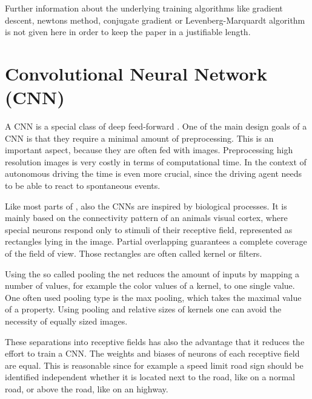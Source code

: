 Further information about the underlying training algorithms like gradient descent, newtons method, conjugate gradient or Levenberg-Marquardt algorithm is not given here in order to keep the paper in a justifiable length.  


\section{Convolutional Neural Network (CNN)}\label{sec:CNN}

A CNN is a special class of deep feed-forward \nns. One of the main design goals of a CNN is that they require a minimal amount of preprocessing. This is an important aspect, because they are often fed with images. Preprocessing high resolution images is very costly in terms of computational time. In the context of autonomous driving the time is even more crucial, since the driving agent needs to be able to react to spontaneous events.

Like most parts of \nns, also the CNNs are inspired by biological processes. It is mainly based on the connectivity pattern of an animals visual cortex, where special neurons respond only to stimuli of their receptive field, represented as rectangles lying in the image. Partial overlapping guarantees a complete coverage of the field of view. Those rectangles are often called kernel or filters.\cite{matsugu2003subject}


Using the so called pooling the net reduces the amount of inputs by mapping a number of values, for example the color values of a kernel, to one single value. One often used pooling type is the max pooling, which takes the maximal value of a property. Using pooling and relative sizes of kernels one can avoid the necessity of equally sized images. \cite{wiki:CNN} 

These separations into receptive fields has also the advantage that it reduces the effort to train a CNN. The weights and biases of neurons of each receptive field are equal. This is reasonable since for example a speed limit road sign should be identified independent whether it is located next to the road, like on a normal road, or above the road, like on an highway. \cite{lecun2015lenet}

